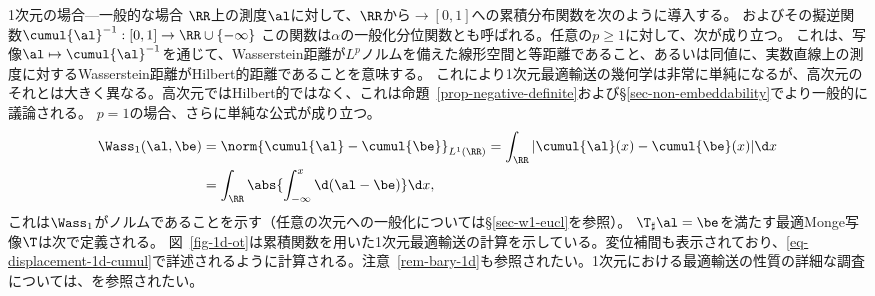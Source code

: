 \begin{rem2}{1次元の場合---一般的な場合}\label{rem-1d-ot-generic}
$\RR$上の測度$\al$に対して、$\RR$から$\rightarrow [0,1]$への累積分布関数を次のように導入する。
およびその擬逆関数$\cumul{\al}^{-1} : [0,1] \rightarrow \RR \cup \{-\infty\}$
%
この関数は$\alpha$の一般化分位関数とも呼ばれる。任意の$p \geq 1$に対して、次が成り立つ。
これは、写像$\al \mapsto \cumul{\al}^{-1}$を通じて、Wasserstein距離が$L^p$ノルムを備えた線形空間と等距離であること、あるいは同値に、実数直線上の測度に対するWasserstein距離がHilbert的距離であることを意味する。
これにより1次元最適輸送の幾何学は非常に単純になるが、高次元のそれとは大きく異なる。高次元ではHilbert的ではなく、これは命題~\ref{prop-negative-definite}および\S\ref{sec-non-embeddability}でより一般的に議論される。
%
$p=1$の場合、さらに単純な公式が成り立つ。
\begin{align}\label{eq-w1-1d}
	\Wass_1(\al,\be) &= \norm{ \cumul{\al} - \cumul{\be} }_{L^1(\RR)} =
	\int_\RR | \cumul{\al}(x) - \cumul{\be}(x) | \d x \\
	&= \int_\RR \abs{ \int_{-\infty}^x \d(\al-\be) } \d x,
\end{align}
これは$\Wass_1$がノルムであることを示す（任意の次元への一般化については\S\ref{sec-w1-eucl}を参照）。
%
$\T_\sharp \al=\be$を満たす最適Monge写像$\T$は次で定義される。
図~\ref{fig-1d-ot}は累積関数を用いた1次元最適輸送の計算を示している。変位補間も表示されており、\eqref{eq-displacement-1d-cumul}で詳述されるように計算される。注意~\ref{rem-bary-1d}も参照されたい。1次元における最適輸送の性質の詳細な調査については、\cite[Chapter 2]{SantambrogioBook}を参照されたい。
\end{rem2}


